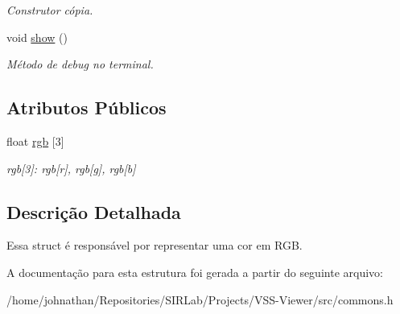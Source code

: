 \begin{DoxyCompactItemize}
\begin{DoxyCompactList}\small\item\em Construtor cópia. \end{DoxyCompactList}\item 
void \hyperlink{structcommon_1_1Pixel_a384d642e3fb610b38c813ff6fd8c50e1}{show} ()\hypertarget{structcommon_1_1Pixel_a384d642e3fb610b38c813ff6fd8c50e1}{}\label{structcommon_1_1Pixel_a384d642e3fb610b38c813ff6fd8c50e1}

\begin{DoxyCompactList}\small\item\em Método de debug no terminal. \end{DoxyCompactList}\end{DoxyCompactItemize}
\subsection*{Atributos Públicos}
\begin{DoxyCompactItemize}
\item 
float \hyperlink{structcommon_1_1Pixel_abf3e7070359fa300aeed9af22c74f118}{rgb} \mbox{[}3\mbox{]}\hypertarget{structcommon_1_1Pixel_abf3e7070359fa300aeed9af22c74f118}{}\label{structcommon_1_1Pixel_abf3e7070359fa300aeed9af22c74f118}

\begin{DoxyCompactList}\small\item\em rgb\mbox{[}3\mbox{]}\+: rgb\mbox{[}r\mbox{]}, rgb\mbox{[}g\mbox{]}, rgb\mbox{[}b\mbox{]} \end{DoxyCompactList}\end{DoxyCompactItemize}


\subsection{Descrição Detalhada}
Essa struct é responsável por representar uma cor em R\+GB. 

A documentação para esta estrutura foi gerada a partir do seguinte arquivo\+:\begin{DoxyCompactItemize}
\item 
/home/johnathan/\+Repositories/\+S\+I\+R\+Lab/\+Projects/\+V\+S\+S-\/\+Viewer/src/commons.\+h\end{DoxyCompactItemize}
